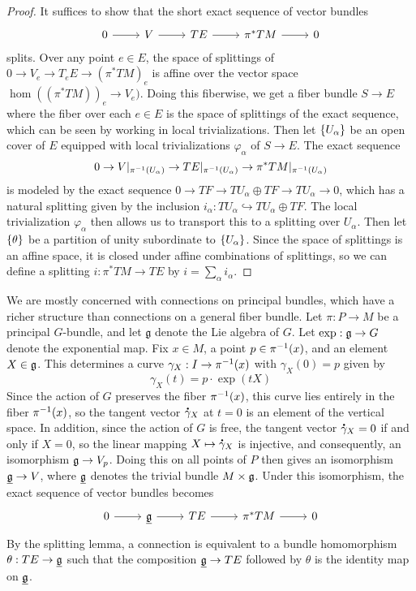 \begin{proof}
It suffices to show that the short exact sequence of vector bundles
\[\begin{tikzcd}
0 \ar[r] & V \ar[r] & TE \ar[r] & \pi^*TM \ar[r] & 0
\end{tikzcd}\]
splits. Over any point $e \in E$, the space of splittings of
$0 \to V_e \to T_eE \to (\pi^*TM)_e$ is affine over the vector space
$\hom((\pi^*TM))_e \to V_e)$. Doing this fiberwise, we get a fiber bundle
$S \to E$ where the fiber over each $e \in E$ is the space of splittings
of the exact sequence, which can be seen by working in local trivializations.
Then let $\left\lbrace U_\alpha \right\rbrace$ be an open cover of $E$ equipped with local
trivializations $\varphi_\alpha$ of $S \to E$. The exact sequence
\[
0 \to V\vert_{\pi^{-1}(U_\alpha)} \to TE\vert_{\pi^{-1}(U_\alpha)} \to
\pi^*TM\vert_{\pi^{-1}(U_\alpha)}
\]
is modeled by the exact sequence $0 \to TF \to TU_\alpha \oplus TF \to TU_\alpha \to 0$,
which has a natural splitting given by the inclusion
$i_\alpha : TU_\alpha \hookrightarrow TU_\alpha \oplus TF$. The local trivialization
$\varphi_\alpha$ then allows us to transport this to a splitting over $U_\alpha$.
Then let $\left\lbrace \theta \right\rbrace$ be a partition of unity subordinate to $\left\lbrace U_\alpha \right\rbrace$.
Since the space of splittings is an affine space, it is closed under affine
combinations of splittings, so we can define a splitting
$i : \pi^*TM \to TE$ by $i = \sum_\alpha i_\alpha$.
\end{proof}
We are mostly concerned with connections on principal bundles, which have a
richer structure than connections on a general fiber bundle. Let $\pi : P \to M$
be a principal $G$-bundle, and let $\mathfrak{g}$ denote the Lie algebra of $G$.
Let $\exp : \mathfrak{g} \to G$ denote the exponential map. Fix $x \in M$, a point
$p \in \pi^{-1}(x)$, and an element $X \in \mathfrak{g}$. This determines a curve
$\gamma_X : I \to \pi^{-1}(x)$ with $\gamma_X(0) = p$ given by
\[
\gamma_X(t) = p \cdot \exp(tX)
\]
Since the action of $G$ preserves the fiber $\pi^{-1}(x)$, this curve lies
entirely in the fiber $\pi^{-1}(x)$, so the tangent vector $\accentset{\mbox{\large\bfseries .}}{\gamma}_X$
at $t = 0$ is an element of the vertical space. In addition, since the
action of $G$ is free, the tangent vector $\accentset{\mbox{\large\bfseries .}}{\gamma}_X = 0$ if and only if
$X = 0$, so the linear mapping $X \mapsto \accentset{\mbox{\large\bfseries .}}{\gamma}_X$ is injective, and
consequently, an isomorphism $\mathfrak{g} \to V_p$. Doing this on all points of $P$
then gives an isomorphism $\underline{\mathfrak{g}} \to V$, where $\underline{\mathfrak{g}}$ denotes
the trivial bundle $M \times \mathfrak{g}$. Under this isomorphism, the exact
sequence of vector bundles becomes
\[\begin{tikzcd}
0 \ar[r] & \underline{\g} \ar[r] & TE \ar[r] & \pi^*TM \ar[r] & 0
\end{tikzcd}\]
By the splitting lemma, a connection is equivalent to a bundle homomorphism
$\theta : TE \to \underline{\mathfrak{g}}$ such that the composition $\underline{\mathfrak{g}} \to TE$
followed by $\theta$ is the identity map on $\underline{\mathfrak{g}}$.
\fi
%
